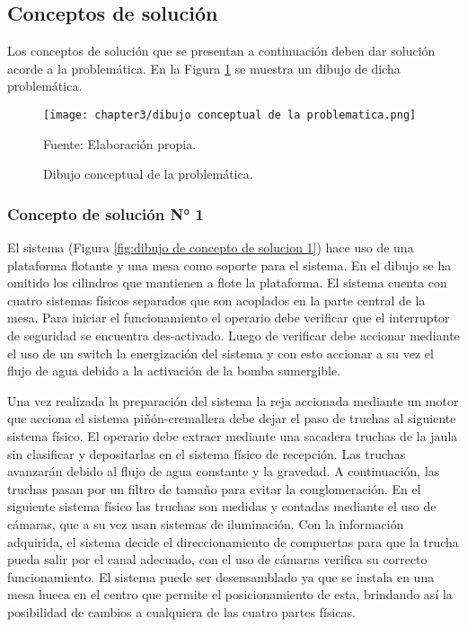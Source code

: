 \newpage
\pagestyle{myportland}

\subsection{Conceptos de solución}

Los conceptos de solución que se presentan a continuación deben dar solución acorde a la problemática. En la Figura \ref{fig:dibujo conceptual de la problematica} se muestra un dibujo de dicha problemática.

\begin{figure}[H]
	\centering
	\texttt{[image: chapter3/dibujo conceptual de la problematica.png]}
	\caption{Dibujo conceptual de la problemática.}
	\begin{myflushleftportland}
		Fuente: Elaboración propia.
	\end{myflushleftportland}
	\label{fig:dibujo conceptual de la problematica}
\end{figure}

\subsubsection{Concepto de solución N° 1}

El sistema (Figura \ref{fig:dibujo de concepto de solucion 1}) hace uso de una plataforma flotante y una mesa como soporte para el sistema. En el dibujo se ha omitido los cilindros que mantienen a flote la plataforma. El sistema cuenta con cuatro sistemas físicos separados que son acoplados en la parte central de la mesa. Para iniciar el funcionamiento el operario debe verificar que el interruptor de seguridad se encuentra des-activado. Luego de verificar debe accionar mediante el uso de un switch la energización del sistema y con esto accionar a su vez el flujo de agua debido a la activación de la bomba sumergible.

Una vez realizada la preparación del sistema la reja accionada mediante un motor que acciona el sistema piñón-cremallera debe dejar el paso de truchas al siguiente sistema físico. El operario debe extraer mediante una sacadera truchas de la jaula sin clasificar y depositarlas en el sistema físico de recepción. Las truchas avanzarán debido al flujo de agua constante y la gravedad. A continuación, las truchas pasan por un filtro de tamaño para evitar la conglomeración. En el siguiente sistema físico las truchas son medidas y contadas mediante el uso de cámaras, que a su vez usan sistemas de iluminación. Con la información adquirida, el sistema decide el direccionamiento de compuertas para que la trucha pueda salir por el canal adecuado, con el uso de cámaras verifica su correcto funcionamiento.
El sistema puede ser desensamblado ya que se instala en una mesa hueca en el centro que permite el posicionamiento de esta, brindando así la posibilidad de cambios a cualquiera de las cuatro partes físicas.



